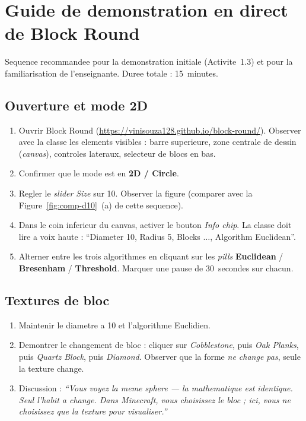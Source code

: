 \documentclass[12pt,a4paper]{scrartcl}
\newcommand{\acc}[1]{\textcolor{accent}{\textbf{#1}}}
\begin{document}
\section{Guide de demonstration en direct de Block Round}\label{ap:roteiro}

Sequence recommandee pour la demonstration initiale (Activite~1.3) et pour la familiarisation de l'enseignant\textperiodcentered e. Duree totale : 15~minutes.

\subsection{Ouverture et mode 2D}
\begin{enumerate}[leftmargin=1.5em,itemsep=0.15em,topsep=0.3em]
  \item Ouvrir Block Round (\url{https://vinisouza128.github.io/block-round/}). Observer avec la classe les elements visibles : barre superieure, zone centrale de dessin (\emph{canvas}), controles lateraux, selecteur de blocs en bas.
  \item Confirmer que le mode est en \acc{2D / Circle}.
  \item Regler le \emph{slider} \emph{Size} sur 10. Observer la figure (comparer avec la Figure~\ref{fig:comp-d10}~(a) de cette sequence).
  \item Dans le coin inferieur du canvas, activer le bouton \emph{Info chip}. La classe doit lire a voix haute : \enquote{Diameter 10, Radius 5, Blocks $\dots$, Algorithm Euclidean}.
  \item Alterner entre les trois algorithmes en cliquant sur les \emph{pills} \acc{Euclidean} / \acc{Bresenham} / \acc{Threshold}. Marquer une pause de 30~secondes sur chacun.
\end{enumerate}

\subsection{Textures de bloc}

\begin{enumerate}[leftmargin=1.5em,itemsep=0.15em,topsep=0.3em]
  \item Maintenir le diametre a 10 et l'algorithme Euclidien.
  \item Demontrer le changement de bloc : cliquer sur \emph{Cobblestone}, puis \emph{Oak Planks}, puis \emph{Quartz Block}, puis \emph{Diamond}. Observer que la forme \emph{ne change pas}, seule la texture change.
  \item Discussion : \emph{\enquote{Vous voyez la meme sphere --- la mathematique est identique. Seul l'habit a change. Dans Minecraft, vous choisissez le bloc ; ici, vous ne choisissez que la texture pour visualiser.}}
\end{enumerate}
\end{document}

